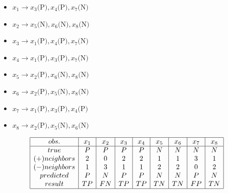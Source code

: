 \documentclass[12pt]{article}
\begin{document}
\begin{enumerate}[leftmargin=\labelsep, label=\textbf{\arabic*.)}]
\begin{itemize}
                    \vspace{1.5em}

                    \begin{itemize}
                        \item \( x_1 \rightarrow x_3\text{(P)}, x_4\text{(P)}, x_7\text{(N)} \)
                        \item \( x_2 \rightarrow x_5\text{(N)}, x_6\text{(N)}, x_8\text{(N)} \)
                        \item \( x_3 \rightarrow x_1\text{(P)}, x_4\text{(P)}, x_7\text{(N)} \)
                        \item \( x_4 \rightarrow x_1\text{(P)}, x_3\text{(P)}, x_7\text{(N)} \)
                        \item \( x_5 \rightarrow x_2\text{(P)}, x_6\text{(N)}, x_8\text{(N)} \)
                        \item \( x_6 \rightarrow x_2\text{(P)}, x_5\text{(N)}, x_8\text{(N)} \)
                        \item \( x_7 \rightarrow x_1\text{(P)}, x_3\text{(P)}, x_4\text{(P)} \)
                        \item \( x_8 \rightarrow x_2\text{(P)}, x_5\text{(N)}, x_6\text{(N)} \)
                    \end{itemize}

                    \vspace{1.5em}

                    \begin{minipage}{1\textwidth}
                        \[
                            \begin{array}{|c|c|c|c|c|c|c|c|c|}
                                \hline
                                obs.          & x_1 & x_2 & x_3 & x_4 & x_5 & x_6 & x_7 & x_8 \\
                                \hline
                                true          & P   & P   & P   & P   & N   & N   & N   & N   \\
                                (+) neighbors & 2   & 0   & 2   & 2   & 1   & 1   & 3   & 1   \\
                                (-) neighbors & 1   & 3   & 1   & 1   & 2   & 2   & 0   & 2   \\
                                predicted     & P   & N   & P   & P   & N   & N   & P   & N   \\
                                result        & TP  & FN  & TP  & TP  & TN  & TN  & FP  & TN  \\
                                \hline
                            \end{array}
                        \]
                    \end{minipage}


\end{itemize}
\end{enumerate}
\end{document}

